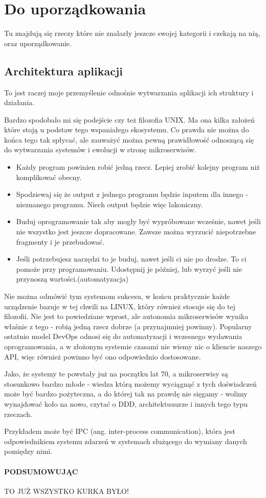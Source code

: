 \chapter{Do uporządkowania}
Tu znajdują się rzeczy które nie znalazły jeszcze swojej kategorii i czekają na nią, oraz uporządkowanie.


\section{Architektura aplikacji}
To jest raczej moje przemyślenie odnośnie wytwarzania aplikacji ich struktury i działania.

Bardzo spodobało mi się podejście czy też filozofia UNIX. Ma ona kilka założeń które stoją u podstaw tego wspaniałego ekosystemu.
Co prawda nie można do końca tego tak spłycać, ale zauważyć można pewną prawidłowość odnoszącą się do wytwarzania systemów i ewolucji w stronę mikroserwisów.

	\begin{itemize}
		\item Każdy program powinien robić jedną rzecz. Lepiej zrobić kolejny program niż komplikować obecny.
		\item Spodziewaj się że output z jednego programu będzie inputem dla innego - nieznanego programu. Niech output będzie więc lakoniczny.
		\item Buduj oprogramowanie tak aby mogły być wypróbowane wcześnie, nawet jeśli nie wszystko jest jeszcze dopracowane. Zawsze można wyrzucić niepotrzebne fragmenty i je przebudować.
		\item Jeśli potrzebujesz narzędzi to je buduj, nawet jeśli ci nie po drodze. To ci pomoże przy programowaniu. Udostępnij je później, lub wyrzyć jeśli nie przynoszą wartości.(automatyzacja)
	\end{itemize}

Nie można odmówić tym systemom sukcesu, w końcu praktycznie każde urządzenie bazuje w tej chwili na LINUX, który również stosuje się do tej filozofii. 
Nie jest to powiedziane wprost, ale autonomia mikroserwisów wynika właśnie z tego - robią jedną rzecz dobrze (a przynajmniej powinny).
Popularny ostatnio model DevOps odnosi się do automatyzacji i wczesnego wydawania oprogramowania, a w złożonym systemie czasami nie wiemy nic o kliencie naszego API, więc również powinno być ono odpowiednio dostosowane.

Jako, że systemy te powstały już na początku lat 70, a mikroserwisy są stosunkowo bardzo młode - wiedza którą możemy wyciągnąć z tych doświadczeń może być bardzo pożyteczna, a do której tak na prawdę nie sięgamy - wolimy wynajdować koło na nowo, czytać o DDD, architektuuurze i innych tego typu rzeczach.

Przykładem może być IPC (ang. inter-process communication), która jest odpowiednikiem systemu zdarzeń w systemach służącego do wymiany danych pomiędzy nimi.

\subsubsection{PODSUMOWUJĄC}
TO JUŻ WSZYSTKO KURKA BYŁO!
